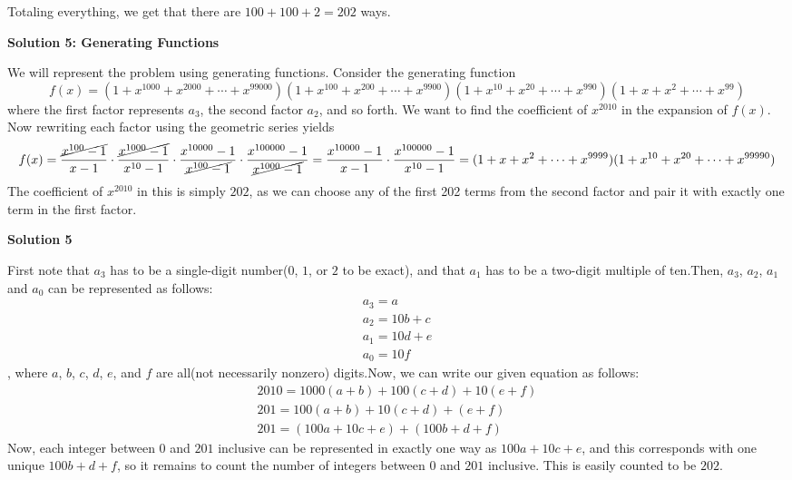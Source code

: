 \begin{enumerate}
 Totaling everything, we get that there are $100 + 100 + 2 = \boxed{202}$ ways.

 



\textbf{Solution 5: Generating Functions}

We will represent the problem using generating functions. Consider the generating function 
 \[f(x) = (1+x^{1000}+x^{2000}+\cdots+x^{99000})(1+x^{100}+x^{200}+\cdots+x^{9900})(1+x^{10}+x^{20}+\cdots+x^{990})(1+x+x^2+\cdots+x^{99})\]where the first factor represents $a_3$, the second factor $a_2$, and so forth. We want to find the coefficient of $x^{2010}$ in the expansion of $f(x)$. Now rewriting each factor using the geometric series yields 
 \[f(x) = \frac{\cancel{x^{100}-1}}{x-1} \cdot \frac{\cancel{x^{1000}-1}}{x^{10}-1} \cdot \frac{x^{10000}-1}{\cancel{x^{100}-1}} \cdot \frac{x^{100000}-1}{\cancel{x^{1000}-1}}=\frac{x^{10000}-1}{x-1} \cdot \frac{x^{100000}-1}{x^{10}-1} = (1+x+x^2+\cdots + x^{9999})(1+x^{10}+x^{20}+\cdots+x^{99990})\]The coefficient of $x^{2010}$ in this is simply $\boxed{202}$, as we can choose any of the first 202 terms from the second factor and pair it with exactly one term in the first factor.

 



\textbf{Solution 5}

First note that $a_3$ has to be a single-digit number($0$, $1$, or $2$ to be exact), and that $a_1$ has to be a two-digit multiple of ten.Then, $a_3$, $a_2$, $a_1$ and $a_0$ can be represented as follows:
 \begin{align*} a_3 = a \\ a_2 = 10b+c \\ a_1= 10d+e \\ a_0 = 10f \end{align*}
, where $a$, $b$, $c$, $d$, $e$, and $f$ are all(not necessarily nonzero) digits.Now, we can write our given equation as follows:
 \begin{align*} 2010 = 1000(a+b) + 100(c+d) + 10(e+f) \\ 201 = 100(a+b) + 10(c+d) + (e+f) \\ 201 = (100a + 10c + e) + (100b + d + f) \end{align*}
Now, each integer between $0$ and $201$ inclusive can be represented in exactly one way as $100a + 10c + e$, and this corresponds with one unique $100b + d + f$, so it remains to count the number of integers between $0$ and $201$ inclusive. This is easily counted to be $\boxed{202}$.


\end{enumerate}
